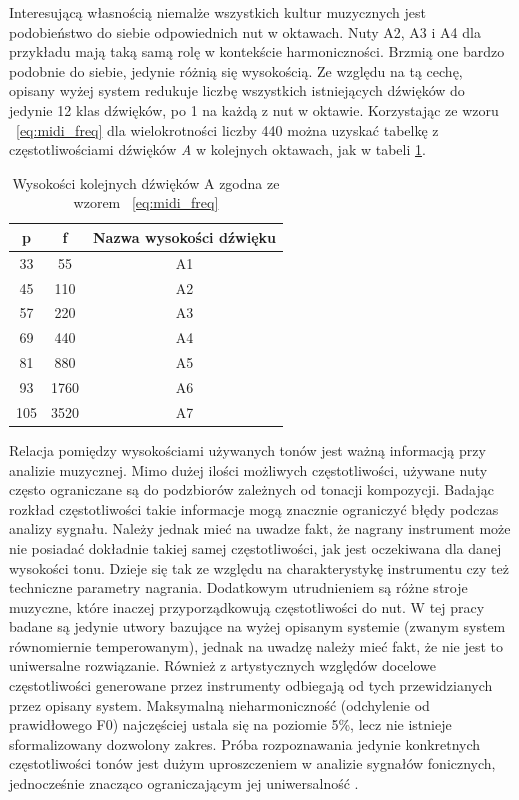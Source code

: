 \documentclass[12pt,a4paper,twoside]{mwart}
\begin{document}
Interesującą własnością niemalże wszystkich kultur muzycznych jest podobieństwo do siebie odpowiednich nut w oktawach. Nuty A2, A3 i A4 dla przykładu mają taką samą rolę w kontekście harmoniczności. Brzmią one bardzo podobnie do siebie, jedynie różnią się wysokością. Ze względu na tą cechę, opisany wyżej system redukuje liczbę wszystkich istniejących dźwięków do jedynie 12 klas dźwięków, po 1 na każdą z nut w oktawie. Korzystając ze wzoru ~\ref{eq:midi_freq} dla wielokrotności liczby 440 można uzyskać tabelkę z częstotliwościami dźwięków \textit{A} w kolejnych oktawach, jak w tabeli \ref{tab:FqMidi}.

\begin{table}[ht]
  \begin{center}
    \begin{tabular}{ |c|c|c| } 
    \hline
    p & f & Nazwa wysokości dźwięku\\
    \hline
    33 & 55 & A1\\
    45 & 110 & A2\\
    57 & 220 & A3\\
    69 & 440 & A4\\
    81 & 880 & A5\\
    93 & 1760 & A6\\
    105 & 3520 & A7\\
    \hline
    \end{tabular}
  \end{center}
  \caption{Wysokości kolejnych dźwięków A zgodna ze wzorem ~\ref{eq:midi_freq}}
  \label{tab:FqMidi}
\end{table}

Relacja pomiędzy wysokościami używanych tonów jest ważną informacją przy analizie muzycznej. Mimo dużej ilości możliwych częstotliwości, używane nuty często ograniczane są do podzbiorów zależnych od tonacji kompozycji. Badając rozkład częstotliwości takie informacje mogą znacznie ograniczyć błędy podczas analizy sygnału. Należy jednak mieć na uwadze fakt, że nagrany instrument może nie posiadać dokładnie takiej samej częstotliwości, jak jest oczekiwana dla danej wysokości tonu. Dzieje się tak ze względu na charakterystykę instrumentu czy też techniczne parametry nagrania. Dodatkowym utrudnieniem są różne stroje muzyczne, które inaczej przyporządkowują częstotliwości do nut. W tej pracy badane są jedynie utwory bazujące na wyżej opisanym systemie (zwanym system równomiernie temperowanym), jednak na uwadzę należy mieć fakt, że nie jest to uniwersalne rozwiązanie. Również z artystycznych względów docelowe częstotliwości generowane przez instrumenty odbiegają od tych przewidzianych przez opisany system. Maksymalną nieharmoniczność (odchylenie od prawidłowego F0) najczęściej ustala się na poziomie 5\%, lecz nie istnieje sformalizowany dozwolony zakres. Próba rozpoznawania jedynie konkretnych częstotliwości tonów jest dużym uproszczeniem w analizie sygnałów fonicznych, jednocześnie znacząco ograniczającym jej uniwersalność 
\cite[64-65]{Homerecording:DlaKazdego}
\cite[7-11]{Transcription:Anssi:SignalProcessingMethods}.
\end{document}
